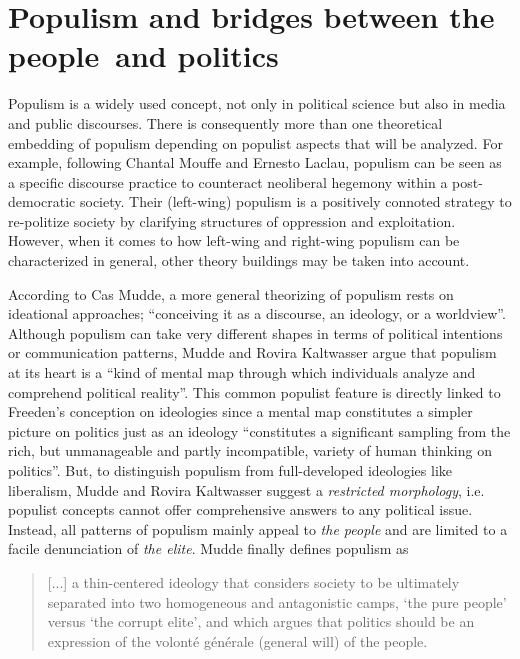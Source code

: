 \documentclass[a4paper]{scrreprt}
\begin{document}
\section{Populism and bridges between \guilsinglright the people\guilsinglleft\ and \guilsinglright politics\guilsinglleft}
Populism is a widely used concept, not only in political science but also in media and public discourses. There is consequently more than one theoretical embedding of populism depending on populist aspects that will be analyzed. For example, following Chantal Mouffe and Ernesto Laclau, populism can be seen as a specific discourse practice to counteract neoliberal hegemony within a post-democratic society. Their (left-wing) populism is a positively connoted strategy to re-politize society by clarifying structures of oppression and exploitation. \citep{laclaumouffe:2001} However, when it comes to how left-wing and right-wing populism can be characterized in general, other theory buildings may be taken into account.\par
According to Cas Mudde, a more general theorizing of populism rests on ideational approaches; ``conceiving it as a discourse, an ideology, or a worldview''. \cite[p.~5]{mudde:2017} Although populism can take very different shapes in terms of political intentions or communication patterns, Mudde and Rovira Kaltwasser argue that populism at its heart is a ``kind of mental map through which individuals analyze and comprehend political reality''. \cite[p.~6]{mudde:2017} This common populist feature is directly linked to Freeden's conception on ideologies since a mental map constitutes a simpler picture on politics just as an ideology ``constitutes a significant sampling from the rich, but unmanageable and partly incompatible, variety of human thinking on politics''. \cite[p.~54]{freeden:1998} But, to distinguish populism from full-developed ideologies like liberalism, Mudde and Rovira Kaltwasser suggest a {\em restricted morphology}, i.e. populist concepts cannot offer comprehensive answers to any political issue. Instead, all patterns of populism mainly appeal to {\em the people} and are limited to a facile denunciation of {\em the elite}. Mudde finally defines populism as\par
\begin{quote}
    [...] a thin-centered ideology that considers society to be ultimately separated into two homogeneous and antagonistic camps, `the pure people' versus `the corrupt elite', and which argues that politics should be an expression of the volonté générale (general will) of the people. \cite[p.~6]{mudde:2017}
\end{quote}
\end{document}
